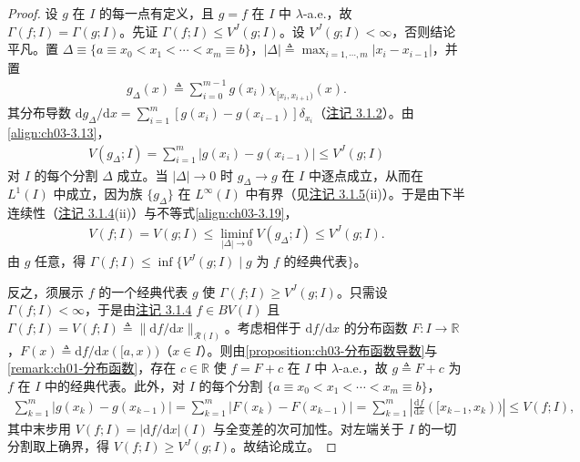 \documentclass[../../main.tex]{subfiles}%
\begin{document}
\begin{proof}
设 $g$ 在 $I$ 的每一点有定义，且 $g=f$ 在 $I$ 中 $\lambda$-a.e.，故 $\Gamma(f;I)=\Gamma(g;I)$。先证 $\Gamma(f;I)\leqslant V^J(g;I)$。设 $V^J(g;I)<\infty$，否则结论平凡。置 $\Delta\equiv\{a\equiv x_0<x_1<\cdots<x_m\equiv b\}$，$|\Delta|\triangleq\max_{i=1,\cdots ,m}|x_i-x_{i-1}|$，并置
\begin{align*}
g_\Delta(x)\triangleq \sum_{i=0}^{m-1}g(x_i)\chi_{[x_i,x_{i+1})}(x).
\end{align*}
其分布导数 $\mathrm{d}g_\Delta/\mathrm{d}x=\sum_{i=1}^m[g(x_i)-g(x_{i-1})]\delta_{x_i}$（\hyperref[remark:ch03-阶梯函数导数]{注记 3.1.2}）。由\eqref{align:ch03-3.13}，
\begin{align}
V(g_\Delta;I)=\sum_{i=1}^m|g(x_i)-g(x_{i-1})|\leqslant V^J(g;I)\label{align:ch03-3.19}
\end{align}
对 $I$ 的每个分割 $\Delta$ 成立。当 $|\Delta|\to0$ 时 $g_\Delta\to g$ 在 $I$ 中逐点成立，从而在 $L^1(I)$ 中成立，因为族 $\{g_\Delta\}$ 在 $L^\infty(I)$ 中有界（见\hyperref[remark:ch03-Stieltjes]{注记 3.1.5}(ii)）。于是由下半连续性（\hyperref[remark:ch03-BV等价]{注记 3.1.4}(ii)）与不等式\eqref{align:ch03-3.19}，
\begin{align*}
V(f;I)=V(g;I)\leqslant\liminf_{|\Delta|\to0}V(g_\Delta;I)\leqslant V^J(g;I).
\end{align*}
由 $g$ 任意，得 $\Gamma(f;I)\leqslant\inf\{V^J(g;I)\mid g\text{ 为 }f\text{ 的经典代表}\}$。

反之，须展示 $f$ 的一个经典代表 $g$ 使 $\Gamma(f;I)\geqslant V^J(g;I)$。只需设 $\Gamma(f;I)<\infty$，于是由\hyperref[remark:ch03-BV等价]{注记 3.1.4} $f\in BV(I)$ 且 $\Gamma(f;I)=V(f;I)\triangleq\|\mathrm{d}f/\mathrm{d}x\|_{\mathscr{R}(I)}$。考虑相伴于 $\mathrm{d}f/\mathrm{d}x$ 的分布函数 $F:I\to\mathbb{R}$，$F(x)\triangleq\mathrm{d}f/\mathrm{d}x([a,x))$（$x\in I$）。则由\cref{proposition:ch03-分布函数导数}与\cref{remark:ch01-分布函数}，存在 $c\in\mathbb{R}$ 使 $f=F+c$ 在 $I$ 中 $\lambda$-a.e.，故 $g\triangleq F+c$ 为 $f$ 在 $I$ 中的经典代表。此外，对 $I$ 的每个分割 $\{a\equiv x_0<x_1<\cdots<x_m\equiv b\}$，
\begin{align*}
\sum_{k=1}^m|g(x_k)-g(x_{k-1})|
=\sum_{k=1}^m|F(x_k)-F(x_{k-1})|
=\sum_{k=1}^m\left|\frac{\mathrm{d}f}{\mathrm{d}x}([x_{k-1},x_k))\right|
\leqslant V(f;I),
\end{align*}
其中末步用 $V(f;I)=|\mathrm{d}f/\mathrm{d}x|(I)$ 与全变差的次可加性。对左端关于 $I$ 的一切分割取上确界，得 $V(f;I)\geqslant V^J(g;I)$。故结论成立。
\end{proof}
\end{document}
